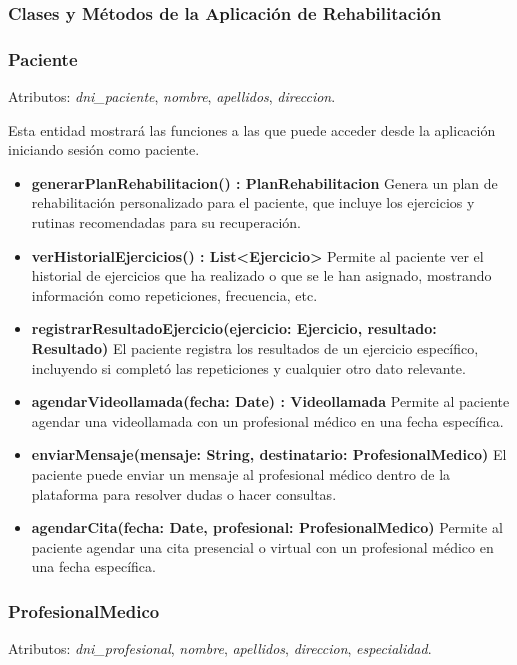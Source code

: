 \documentclass{article}
\begin{document}
\subsubsection*{Clases y Métodos de la Aplicación de Rehabilitación}

\subsubsection*{Paciente}

Atributos: \textit{dni\_paciente}, \textit{nombre}, \textit{apellidos}, \textit{direccion}.

Esta entidad mostrará las funciones a las que puede acceder desde la aplicación iniciando sesión como paciente.

\begin{itemize}
	\item \textbf{generarPlanRehabilitacion() : PlanRehabilitacion}  
	Genera un plan de rehabilitación personalizado para el paciente, que incluye los ejercicios y rutinas recomendadas para su recuperación.
	
	\item \textbf{verHistorialEjercicios() : List<Ejercicio>}  
	Permite al paciente ver el historial de ejercicios que ha realizado o que se le han asignado, mostrando información como repeticiones, frecuencia, etc.
	
	\item \textbf{registrarResultadoEjercicio(ejercicio: Ejercicio, resultado: Resultado)}  
	El paciente registra los resultados de un ejercicio específico, incluyendo si completó las repeticiones y cualquier otro dato relevante.
	
	\item \textbf{agendarVideollamada(fecha: Date) : Videollamada}  
	Permite al paciente agendar una videollamada con un profesional médico en una fecha específica.
	
	\item \textbf{enviarMensaje(mensaje: String, destinatario: ProfesionalMedico)}  
	El paciente puede enviar un mensaje al profesional médico dentro de la plataforma para resolver dudas o hacer consultas.
	
	\item \textbf{agendarCita(fecha: Date, profesional: ProfesionalMedico)}  
	Permite al paciente agendar una cita presencial o virtual con un profesional médico en una fecha específica.
\end{itemize}

\subsubsection*{ProfesionalMedico}
Atributos: \textit{dni\_profesional}, \textit{nombre}, \textit{apellidos}, \textit{direccion}, \textit{especialidad}.
\end{document}

